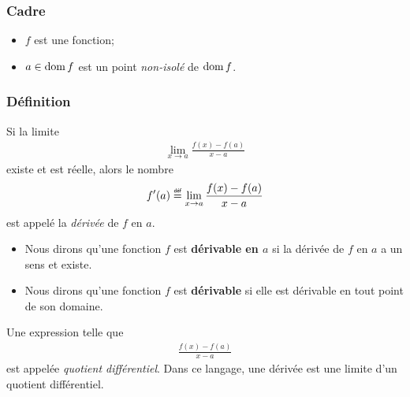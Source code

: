 \documentclass[main.tex]{subfiles}
\begin{document}
\begin{definition}
    [Dérivée]

    \subsubsection*{Cadre}

    \begin{itemize}
        \item $f$ est une fonction;
        \item $a \in \operatorname{dom} f$ est un point \emph{non-isolé} de $\operatorname{dom} f$.
    \end{itemize}

    \subsubsection*{Définition}

    Si la limite
    \begin{align}
        \lim_{x \to a} \frac {f(x) - f(a)} {x - a}
    \end{align}
    existe et est réelle,
    alors le nombre
    \begin{align}
        f'(a) \defeq \lim_{x \to a} \frac {f(x) - f(a)} {x - a}
    \end{align}
    est appelé la \emph{dérivée} de $f$ en $a$.
\end{definition}

\begin{remark}
    [Dérivabilité]

    \begin{itemize}
        \item Nous dirons qu'une fonction $f$ est \textbf{dérivable en $a$}
            si la dérivée de $f$ en $a$ a un sens et existe.
        \item Nous dirons qu'une fonction $f$ est \textbf{dérivable}
            si elle est dérivable en tout point de son domaine.
    \end{itemize}
\end{remark}

\begin{remark}
    Une expression telle que
    \begin{align}
        \frac {f(x) - f(a)} {x - a}
    \end{align}
    est appelée \emph{quotient différentiel}.
    Dans ce langage,
    une dérivée est une limite d'un quotient différentiel.
\end{remark}
\end{document}
